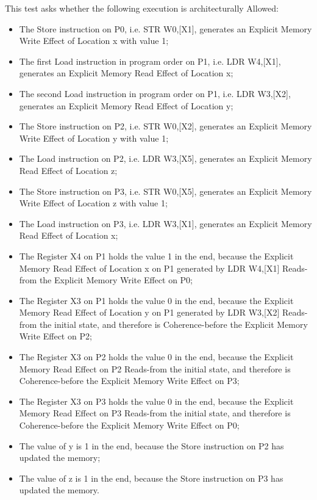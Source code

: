 This test asks whether the following execution is architecturally Allowed:

\begin{itemize}
  \item The Store instruction on P0, i.e. STR W0,[X1], generates an Explicit Memory Write Effect of Location x with value 1;
  \item The first Load instruction in program order on P1, i.e. LDR W4,[X1], generates an Explicit Memory Read Effect of Location x;
  \item The second Load instruction in program order on P1, i.e. LDR W3,[X2], generates an Explicit Memory Read Effect of Location y;
  \item The Store instruction on P2, i.e. STR W0,[X2], generates an Explicit Memory Write Effect of Location y with value 1;
  \item The Load instruction on P2, i.e. LDR W3,[X5], generates an Explicit Memory Read Effect of Location z;
  \item The Store instruction on P3, i.e. STR W0,[X5], generates an Explicit Memory Write Effect of Location z with value 1;
  \item The Load instruction on P3, i.e. LDR W3,[X1], generates an Explicit Memory Read Effect of Location x;
  \item The Register X4 on P1 holds the value 1 in the end, because the Explicit Memory Read Effect of Location x on P1 generated by LDR W4,[X1] Reads-from the Explicit Memory Write Effect on P0;
  \item The Register X3 on P1 holds the value 0 in the end, because the Explicit Memory Read Effect of Location y on P1 generated by LDR W3,[X2] Reads-from the initial state, and therefore is Coherence-before the Explicit Memory Write Effect on P2;
  \item The Register X3 on P2 holds the value 0 in the end, because the Explicit Memory Read Effect on P2 Reads-from the initial state, and therefore is Coherence-before the Explicit Memory Write Effect on P3;
  \item The Register X3 on P3 holds the value 0 in the end, because the Explicit Memory Read Effect on P3 Reads-from the initial state, and therefore is Coherence-before the Explicit Memory Write Effect on P0;
  \item The value of y is 1 in the end, because the Store instruction on P2 has updated the memory;
  \item The value of z is 1 in the end, because the Store instruction on P3 has updated the memory.
\end{itemize}
